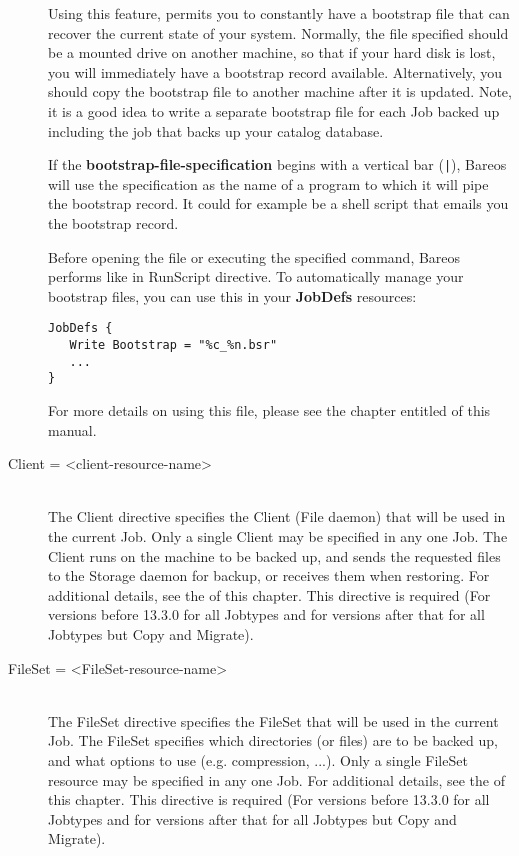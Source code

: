 \begin{description}
Using this feature, permits you to constantly have a bootstrap file that
can recover the current state of your system.  Normally, the file
specified should be a mounted drive on another machine, so that if your
hard disk is lost, you will immediately have a bootstrap record
available.  Alternatively, you should copy the bootstrap file to another
machine after it is updated. Note, it is a good idea to write a separate
bootstrap file for each Job backed up including the job that backs up
your catalog database.

If the {\bf bootstrap-file-specification} begins with a vertical bar
(\verb+|+), Bareos will use the specification as the name of a program to which
it will pipe the bootstrap record.  It could for example be a shell
script that emails you the bootstrap record.

Before opening the file or executing the
specified command, Bareos performs
 like in RunScript
directive. To automatically manage your bootstrap files, you can use
this in your {\bf JobDefs} resources:
\begin{verbatim}
JobDefs {
   Write Bootstrap = "%c_%n.bsr"
   ...
}
\end{verbatim}

For more details on using this file, please see the chapter entitled
 of this manual.

\item [Client = {\textless}client-resource-name{\textgreater}] \hfill \\
The Client directive  specifies the Client (File daemon) that will be used in
the  current Job. Only a single Client may be specified in any one Job.  The
Client runs on the machine to be backed up,  and sends the requested files to
the Storage daemon for backup,  or receives them when restoring. For
additional details, see the
 of this chapter.
This directive is required (For versions before 13.3.0 for all Jobtypes
and for versions after that for all Jobtypes but Copy and Migrate).

\item [FileSet = {\textless}FileSet-resource-name{\textgreater}] \hfill \\
The FileSet directive specifies the FileSet that will be used in the
current Job.  The FileSet specifies which directories (or files) are to
be backed up, and what options to use (e.g.  compression, ...).  Only a
single FileSet resource may be specified in any one Job.  For additional
details, see the  of
this chapter.
This directive is required (For versions before 13.3.0 for all Jobtypes
and for versions after that for all Jobtypes but Copy and Migrate).


\end{description}
